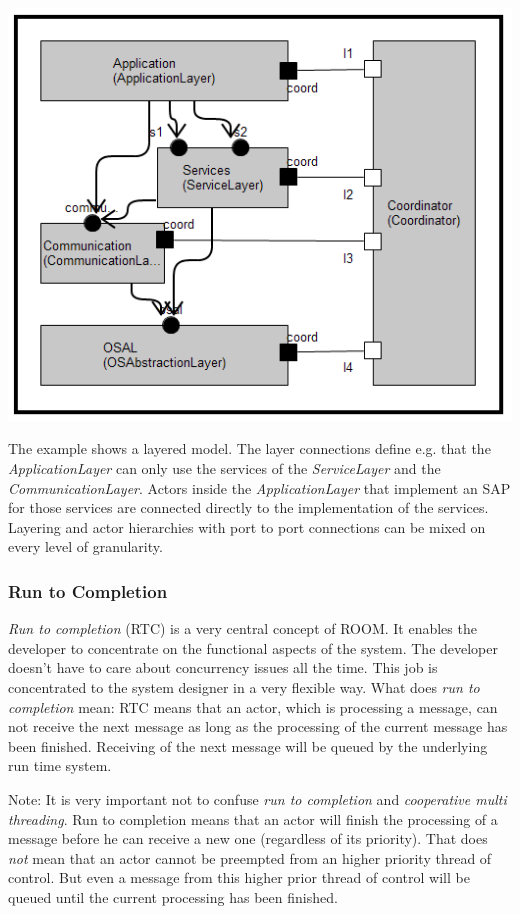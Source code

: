 \includegraphics{images/010-LayerExample.png}

The example shows a layered model. The layer connections define e.g. that the \textit{ApplicationLayer} 
can only use the services of the \textit{ServiceLayer} and the \textit{CommunicationLayer}. Actors inside 
the \textit{ApplicationLayer} that implement an SAP for those services are connected directly to the 
implementation of the services. 
Layering and actor hierarchies with port to port connections can be mixed on every level of granularity. 

\subsubsection{Run to Completion}
\label{sec:run_to_completion}

\emph{Run to completion} (RTC) is a very central concept of ROOM. It enables the developer to 
concentrate on the functional aspects of the system. The developer doesn't have to care about concurrency 
issues all the time. This job is concentrated to the system designer in a very flexible way.
What does \emph{run to completion} mean:
RTC means that an actor, which is processing a message, can not receive the next message as long as the 
processing of the current message has been finished. Receiving of the next message will be queued by the 
underlying run time system.

Note: It is very important not to confuse \emph{run to completion} and \emph{cooperative multi threading}.
Run to completion means that 
an actor will finish the processing of a message before he can receive a new one (regardless of its 
priority). That does \emph{not} mean that an actor cannot be preempted from an higher priority thread of control. 
But even a message from this higher prior thread of control will be queued until the current processing 
has been finished. 

